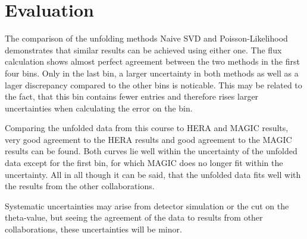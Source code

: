 \section{Evaluation}
\label{sec:diskussion}

The comparison of the unfolding methods Naive SVD and Poisson-Likelihood
demonstrates that similar results can be achieved using either one. The flux
calculation shows almost perfect agreement between the two methods in the first
four bins. Only in the last bin, a larger uncertainty in both methods as well as
a lager discrepancy compared to the other bins is noticable. This may be
related to the fact, that this bin contains fewer entries and therefore rises
larger uncertainties when calculating the error on the bin. \par

Comparing the unfolded data from this course to HERA and MAGIC results, very good
agreement to the HERA results and good agreement to the MAGIC results can be
found. Both curves lie well within the uncertainty of the unfolded data except
for the first bin, for which MAGIC does no longer fit within the uncertainty.
All in all though it can be said, that the unfolded data fits well with the
results from the other collaborations. \par

Systematic uncertainties may arise from detector simulation or the cut on
the theta-value, but seeing the agreement of the data to results from other
collaborations, these uncertainties will be minor.
